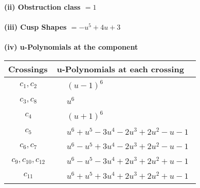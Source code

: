 \documentclass[1p]{elsarticle_modified}
\theoremstyle{definition}
\begin{document}
\flushleft \textbf{(ii) Obstruction class $= 1$}\\~\\
\flushleft \textbf{(iii) Cusp Shapes $= - u^5+4 u+3$}\\~\\
\newpage\renewcommand{\arraystretch}{1}
\flushleft \textbf{(iv) u-Polynomials at the component}\newline \\
\begin{tabular}{m{50pt}|m{274pt}}
Crossings & \hspace{64pt}u-Polynomials at each crossing \\
\hline $$\begin{aligned}c_{1},c_{2}\end{aligned}$$&$\begin{aligned}
&(u-1)^6
\end{aligned}$\\
\hline $$\begin{aligned}c_{3},c_{8}\end{aligned}$$&$\begin{aligned}
&u^6
\end{aligned}$\\
\hline $$\begin{aligned}c_{4}\end{aligned}$$&$\begin{aligned}
&(u+1)^6
\end{aligned}$\\
\hline $$\begin{aligned}c_{5}\end{aligned}$$&$\begin{aligned}
&u^6+u^5-3 u^4-2 u^3+2 u^2- u-1
\end{aligned}$\\
\hline $$\begin{aligned}c_{6},c_{7}\end{aligned}$$&$\begin{aligned}
&u^6- u^5+3 u^4-2 u^3+2 u^2- u-1
\end{aligned}$\\
\hline $$\begin{aligned}c_{9},c_{10},c_{12}\end{aligned}$$&$\begin{aligned}
&u^6- u^5-3 u^4+2 u^3+2 u^2+u-1
\end{aligned}$\\
\hline $$\begin{aligned}c_{11}\end{aligned}$$&$\begin{aligned}
&u^6+u^5+3 u^4+2 u^3+2 u^2+u-1
\end{aligned}$\\
\hline
\end{tabular}\\~\\
\end{document}
